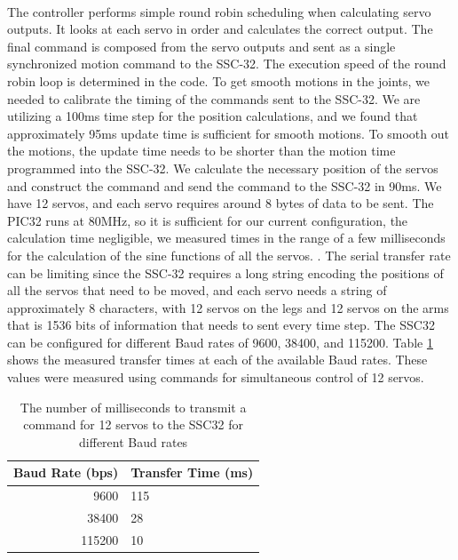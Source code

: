 \documentclass[titlepage,letterpaper,12pt]{article}
\begin{document}
\paragraph{}The controller performs simple round robin scheduling when
calculating servo outputs. It looks at each servo in order and calculates the
correct output. The final command is composed from the servo outputs and sent as
a single synchronized motion command to the SSC-32. The execution speed of the
round robin loop is determined in the code. To get smooth motions in the joints,
we needed to calibrate the timing of the commands sent to the SSC-32. 
We are utilizing a 100ms time step for the position calculations, and we found
that approximately 95ms update time is sufficient for smooth motions. To smooth
out the motions, the update time needs to be shorter than the motion time
programmed into the SSC-32.  We calculate the necessary position of the servos
and construct the command and send the command to the SSC-32 in 90ms. 
We have 12 servos, and each servo requires around 8 bytes of data to be sent.
The PIC32 runs at 80MHz, so it is sufficient for our current configuration, the
calculation time negligible, we measured times in the range of a few
milliseconds for the calculation of the sine functions of all the servos.
\cite{pic32data}. The serial transfer rate can be limiting since the SSC-32
requires a long string encoding the positions of all the servos that need to be
moved, and each servo needs a string of approximately 8 characters, with 12
servos on the legs and 12 servos on the arms that is 1536 bits of information
that needs to sent every time step. The SSC32 can be configured for different
Baud rates of 9600, 38400, and 115200. Table \ref{baudtable} shows the measured
transfer times at each of the available Baud rates. These values were measured
using commands for simultaneous control of 12 servos. 
\begin{table} [!h]
    \begin{tabular}{|r|l|}
        \hline
        Baud Rate (bps) & Transfer Time (ms)\\
        \hline 
        9600 & 115 \\ 
        \hline 
        38400 & 28 \\
        \hline 
        115200 & 10 \\
        \hline
    \end{tabular}
    \caption{The number of milliseconds to transmit a command for 12 servos to
    the SSC32 for different Baud rates}
    \label{baudtable}
\end{table}
\end{document}
